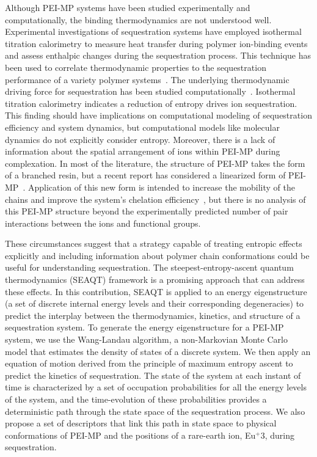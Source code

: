 \documentclass[
journal=jcisd8, %
manuscript=article,
layout=twocolumn   %
]{achemso}
\begin{document}
Although PEI-MP systems have been studied experimentally and computationally, the binding thermodynamics are not understood well. Experimental investigations of sequestration systems have employed isothermal titration calorimetry to measure heat transfer during polymer ion-binding events and assess enthalpic changes during the sequestration process. This technique has been used to correlate thermodynamic properties to the sequestration performance of a variety polymer systems~\cite{Archer2020, Termuhlen2017, Price2018, Archer2022Resins}. The underlying thermodynamic driving force for sequestration has been studied computationally~\cite{Schmidt2002,Welborn2023}. Isothermal titration calorimetry indicates a reduction of entropy drives ion sequestration\cite{Archer2020}. This finding should have implications on computational modeling of sequestration efficiency and system dynamics, but computational models like molecular dynamics do not explicitly consider entropy.  Moreover, there is a lack of information about the spatial arrangement of ions within PEI-MP during complexation. In most of the literature, the structure of PEI-MP takes the form of a branched resin, but a recent report has considered a linearized form of PEI-MP~\cite{Archer2020}. Application of this new form is intended to increase the mobility of the chains and improve the system's chelation efficiency~\cite{Archer2020}, but there is no analysis of this PEI-MP structure beyond the experimentally predicted number of pair interactions between the ions and functional groups.

These circumstances suggest that a strategy capable of treating entropic effects explicitly and including information about polymer chain conformations could be useful for understanding sequestration. The steepest-entropy-ascent quantum thermodynamics (SEAQT) framework is a promising approach that can address these effects. In this contribution, SEAQT is applied to an energy eigenstructure (a set of discrete internal energy levels and their corresponding degeneracies) to predict the interplay between the thermodynamics, kinetics, and structure of a sequestration system. To generate the energy eigenstructure for a PEI-MP system, we use the Wang-Landau algorithm, a non-Markovian Monte Carlo model that estimates the density of states of a discrete system. We then apply an equation of motion derived from the principle of maximum entropy ascent to predict the kinetics of sequestration. The state of the system at each instant of time is characterized by a set of occupation probabilities for all the energy levels of the system, and the time-evolution of these probabilities provides a deterministic path through the state space of the sequestration process. We also propose a set of descriptors that link this path in state space to physical conformations of PEI-MP and the positions of a rare-earth ion, Eu$^+3$, during sequestration.
\end{document}
